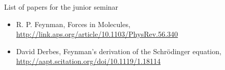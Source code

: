 \documentclass[A4paper, 12pt]{article}
\begin{document}
\begin{center}
  {\huge List of papers for the junior seminar}
\end{center}

\begin{itemize}
  \item
    R. P. Feynman, Forces in Molecules,
    \url{ http://link.aps.org/article/10.1103/PhysRev.56.340 }
  \item
    David Derbes, Feynman’s derivation of the Schrödinger equation,
    \url{http://aapt.scitation.org/doi/10.1119/1.18114}

\end{itemize}
\end{document}
